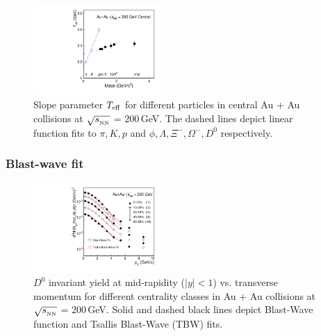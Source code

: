 \documentclass[%
 reprint,	
 amsmath,amssymb,
 aps,
 prc,
]{revtex4-1}
\begin{document}

\begin{figure}
\centering
\includegraphics[width=0.43\textwidth]{fig/Teff_ALL.pdf}
\caption{Slope parameter $T_{\rm eff}$ for different particles in central Au + Au collisions at $\sqrt{s_{_{\rm NN}}}$ = 200\,GeV. The dashed lines depict linear function fits to $\pi,K,p$ and $\phi,\Lambda,\Xi^{-},\Omega^{-},D^0$ respectively.}
\label{fig:Teff_ALL} 
\end{figure}


\subsubsection{\label{result:collectivity:BW}Blast-wave fit}

\begin{figure}
\centering
\includegraphics[width=0.43\textwidth]{fig/BWFit.pdf}
\caption{$D^{0}$ invariant yield at mid-rapidity ($|y|<1$) vs. transverse momentum for different centrality classes in Au + Au collisions at $\sqrt{s_{_{\rm NN}}}$ = 200\,GeV. Solid and dashed black lines depict Blast-Wave function and Tsallis Blast-Wave (TBW) fits.}
\label{fig:BWFit} 
\end{figure}
\end{document}
